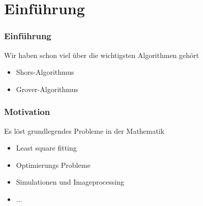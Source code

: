 \section{Einführung}


    \begin{frame}
        \frametitle{Einführung}
        Wir haben schon viel über die wichtigsten Algorithmen gehört
        \begin{itemize} 
            \item  Shors-Algorithmus
            \item  Grover-Algorithmus
        \end{itemize}

        \hfill


    \end{frame}



    \begin{frame}
        \frametitle{Motivation}

        Es löst grundlegendes Probleme in der Mathematik
        \begin{itemize}
            \item   Least square fitting 
            \item   Optimierungs Probleme
            \item   Simulationen und Imageprocessing
            \item   ...
       \end{itemize}

        \hfil

    \end{frame}

